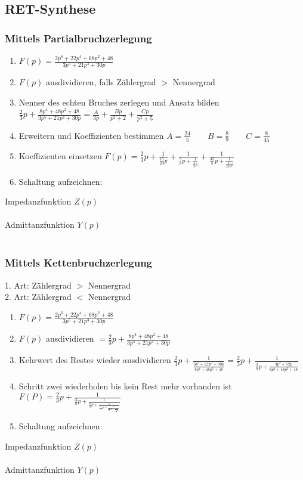 \subsection{RET-Synthese}
\begin{multicols}{2}
\subsubsection{Mittels Partialbruchzerlegung}
	\begin{enumerate}
	  \item $F(p)=\frac{2p^6+22p^4+68p^2+48}{3p^5+21p^3+30p}$
	  \item $F(p)$ ausdividieren, falls Zählergrad $>$ Nennergrad
	  \item Nenner des echten Bruches zerlegen und Ansatz bilden
	  $\frac{2}{3}p+\frac{8p^4+48p^2+48}{3p^5+21p^3+30p}=\frac{A}{3p}+\frac{Bp}{p^2+2}+\frac{Cp}{p^2+5}$
		\item Erweitern und Koeffizienten bestimmen $A=\frac{24}{5} \qquad
		B=\frac{8}{9} \qquad C=\frac{8}{45}$
		\item Koeffizienten einsetzen
		$F(p)=\frac{2}{3}p+\frac{1}{\frac{15}{24}p}+\frac{1}{\frac{9}{8}p+\frac{1}{\frac{4}{9}p}}+\frac{1}{\frac{45}{8}p+\frac{1}{\frac{8}{255}p}}$
		\item Schaltung aufzeichnen:	  
	\end{enumerate}
	Impedanzfunktion $Z(p)$\\
	\\
	Admittanzfunktion $Y(p)$\\
	\\
\subsubsection{Mittels Kettenbruchzerlegung}
1. Art: Zählergrad $>$ Nennergrad\\
2. Art: Zählergrad $<$ Nennergrad\\
\begin{enumerate}
	\item $F(p)=\frac{2p^6+22p^4+68p^2+48}{3p^5+21p^3+30p}$
	\item $F(p)$ ausdividieren $=\frac{2}{3}p+\frac{8p^4+48p^2+48}{3p^5+21p^3+30p}$
	\item Kehrwert des Restes wieder ausdividieren
	$\frac{2}{3}p+\frac{1}{\frac{3p^5+21p^3+30p}{8p^4+48p^2+48}}=\frac{2}{3}p+\frac{1}{\frac{3}{8}p+\frac{3p^3+12p}{8p^4+48p^2+48}}$
	\item Schritt zwei wiederholen bis kein Rest mehr vorhanden ist
	$F(P)=\frac{2}{3}p+\frac{1}{\frac{3}{8}p+\frac{1}{\frac{8}{3}p+\frac{1}{\frac{3}{16}p+\frac{1}{\frac{16}{3}p+\frac{1}{\frac{1}{16}p}}}}}$
	\item Schaltung aufzeichnen:
\end{enumerate}
Impedanzfunktion $Z(p)$\\
\\
Admittanzfunktion $Y(p)$\\
\\
\end{multicols}


